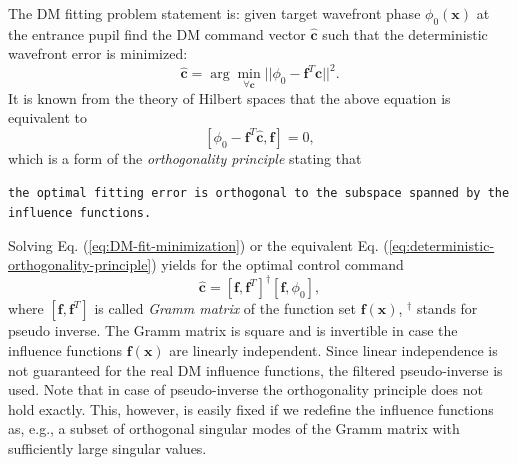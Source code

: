 The DM fitting problem statement is:
given target wavefront phase $\phi_{0}(\bm{x})$ at the entrance pupil find the
DM command vector $\hat{\bm{c}}$ such that the deterministic wavefront error
is minimized:
\begin{equation} \label{eq:DM-fit-minimization}
	\hat{\bm{c}} = \arg \min_{\forall \bm{c}}
	||\phi_{0} - \bm{f}^{T} \bm{c}||^{2}.
\end{equation}
It is known from the theory of Hilbert spaces that the above equation is
equivalent to
\begin{equation} \label{eq:deterministic-orthogonality-principle}
	[\phi_{0} - \bm{f}^{T} \hat{\bm{c}}, \bm{f}] = 0,
\end{equation}
which is a form of the \emph{orthogonality principle} stating that
\begin{flushleft}
	\texttt{the optimal fitting error is orthogonal to the subspace spanned by the
	influence functions.}
\end{flushleft}
Solving Eq. (\ref{eq:DM-fit-minimization}) or the equivalent Eq.
(\ref{eq:deterministic-orthogonality-principle}) yields for the optimal
control command
\begin{equation} \label{eq:fitting-commands}
	\hat{\bm{c}} = [\bm{f},\bm{f}^{T}]^{\dagger} [\bm{f},\phi_{0}],
\end{equation}
where $[\bm{f},\bm{f}^{T}]$ is called \emph{Gramm matrix} of the function set
$\bm{f}(\bm{x})$, $^{\dagger}$ stands for pseudo inverse. The Gramm matrix is
square and is invertible in case the influence functions $\bm{f} (\bm{x})$ are
linearly independent. Since linear independence is not guaranteed for the real
DM influence functions, the filtered pseudo-inverse is used. Note that in case
of pseudo-inverse the orthogonality principle does not hold exactly. This,
however, is easily fixed if we redefine the influence functions as, e.g., a
subset of orthogonal singular modes of the Gramm matrix with sufficiently large
singular values.


